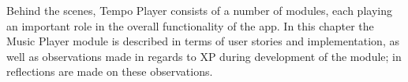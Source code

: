 Behind the scenes, Tempo Player consists of a number of modules, each playing an important role in the overall functionality of the app. In this chapter the Music Player module is described in terms of user stories and implementation, as well as observations made in regards to XP during development of the module; in  reflections are made on these observations.